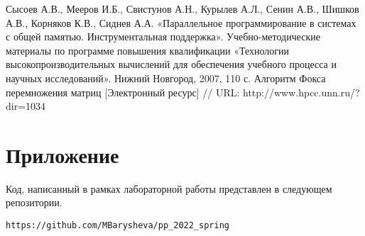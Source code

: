 \documentclass[12pt]{article}
\begin{document}
\newpage

\begin{thebibliography}{}
 Сысоев А.В., Мееров И.Б., Свистунов А.Н., Курылев А.Л., Сенин А.В., Шишков А.В., Корняков К.В., Сиднев А.А. «Параллельное программирование в системах с общей памятью. Инструментальная поддержка». Учебно-методические материалы по программе повышения квалификации «Технологии высокопроизводительных вычислений для обеспечения учебного процесса и научных исследований». Нижний Новгород, 2007, 110 с. 
 Алгоритм Фокса перемножения матриц [Электронный ресурс] // URL: http://www.hpcc.unn.ru/?dir=1034


\end{thebibliography}

\newpage

\section*{Приложение}
Код, написанный в рамках лабораторной работы представлен в следующем репозитории.
\begin{lstlisting}
https://github.com/MBarysheva/pp_2022_spring
\end{lstlisting}
\end{document}
